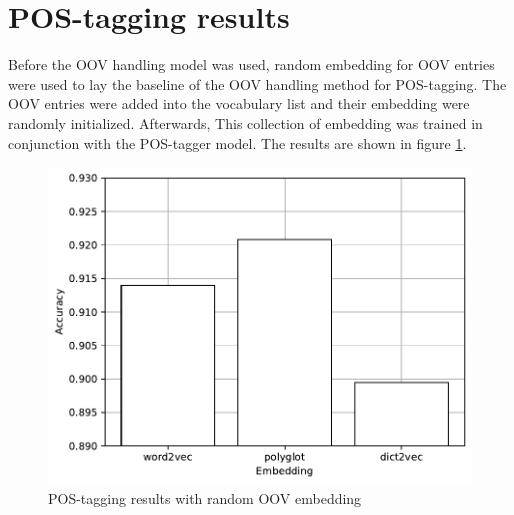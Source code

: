     \section{POS-tagging results}
      Before the OOV handling model was used, random embedding for OOV
      entries were used to lay the baseline of the OOV handling method
      for POS-tagging. The OOV entries were added into the vocabulary
      list and their embedding were randomly initialized. Afterwards,
      This collection of embedding was trained in conjunction with the
      POS-tagger model. The results are shown in figure
      \ref{fig:postag_random_results}.
      \begin{figure}[H]
        \centering
        \includegraphics[width=0.8\linewidth]{images/random_graph.pdf}
        \caption{POS-tagging results with random OOV embedding}
        \label{fig:postag_random_results}
      \end{figure}

